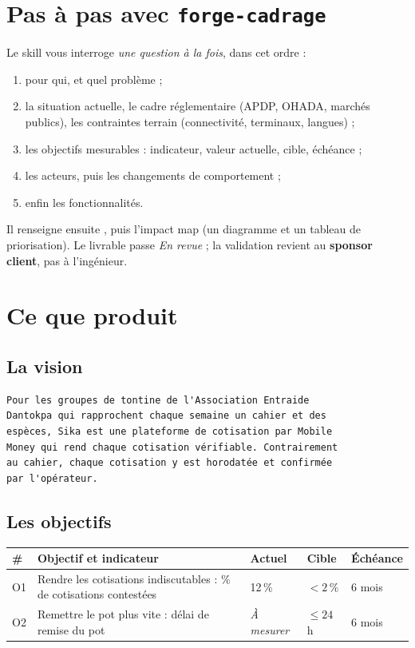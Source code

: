 \section{Pas à pas avec \texttt{forge-cadrage}}
Le skill vous interroge \emph{une question à la fois}, dans cet ordre :
\begin{enumerate}
  \item pour qui, et quel problème ;
  \item la situation actuelle, le cadre réglementaire (APDP, OHADA, marchés publics), les contraintes terrain (connectivité, terminaux, langues) ;
  \item les objectifs mesurables : indicateur, valeur actuelle, cible, échéance ;
  \item les acteurs, puis les changements de comportement ;
  \item enfin les fonctionnalités.
\end{enumerate}
Il renseigne ensuite , puis l'impact map (un diagramme et un tableau de priorisation).
Le livrable passe \emph{En revue} ; la validation revient au \textbf{sponsor client}, pas à l'ingénieur.

\section{Ce que \sika{} produit}
\subsection*{La vision}
\begin{code}
\begin{Verbatim}
Pour les groupes de tontine de l'Association Entraide
Dantokpa qui rapprochent chaque semaine un cahier et des
espèces, Sika est une plateforme de cotisation par Mobile
Money qui rend chaque cotisation vérifiable. Contrairement
au cahier, chaque cotisation y est horodatée et confirmée
par l'opérateur.
\end{Verbatim}
\end{code}

\subsection*{Les objectifs}
\noindent\begin{tabularx}{\linewidth}{lXlll}
\toprule
\textbf{\#} & \textbf{Objectif et indicateur} & \textbf{Actuel} & \textbf{Cible} & \textbf{Échéance} \\ \midrule
O1 & Rendre les cotisations indiscutables : \% de cotisations contestées & 12\,\% & $<2\,\%$ & 6 mois \\
O2 & Remettre le pot plus vite : délai de remise du pot & \textit{À mesurer} & $\le 24$\,h & 6 mois \\
\bottomrule
\end{tabularx}

